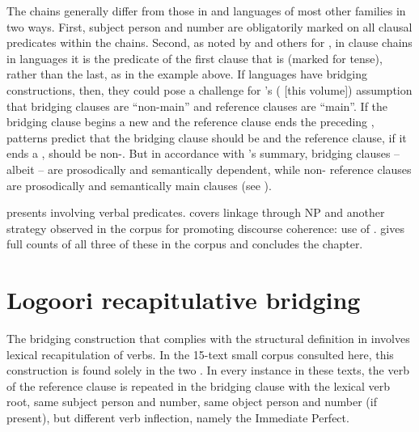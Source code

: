 \documentclass[output=paper]{LSP/langsci}
\begin{document}
The  chains generally differ from those in  and  languages of most other families in two ways. First, subject person and number are obligatorily marked on all clausal predicates within the  chains. Second, as noted by \citet{Haspelmath.1995} and others for , in clause chains in  languages it is the predicate of the first clause that is  (marked for tense), rather than the last, as in the  example above. If  languages have bridging constructions, then, they could pose a challenge for \citeauthor{chapters/01Guerin-Aiton}’s (\citeyear{chapters/01Guerin-Aiton} [this volume]) assumption that bridging clauses are ``non-main'' and reference clauses are ``main''. If the bridging clause begins a new  and the reference clause ends the preceding ,  patterns predict that the bridging clause should be  and the reference clause, if it ends a , should be non-. But in accordance with \citeauthor{chapters/01Guerin-Aiton}’s summary,  bridging clauses -- albeit  -- are prosodically and semantically dependent, while non- reference clauses are prosodically and semantically main clauses (see ). 

 presents   involving verbal predicates.  covers linkage through NP  and another strategy observed in the corpus for promoting discourse coherence: use of .  gives full counts of all three of these in the corpus and concludes the chapter.

\section{Logoori recapitulative bridging}
\label{Sarecap.bridg}
The  bridging construction that complies with the structural definition in  involves lexical recapitulation of verbs. In the 15-text small corpus consulted here, this construction is found solely in the two . In every instance in these texts, the verb of the reference clause is repeated in the bridging clause with the lexical verb root, same subject person and number, same object person and number (if present), but different verb inflection, namely the Immediate Perfect. 
\end{document}

